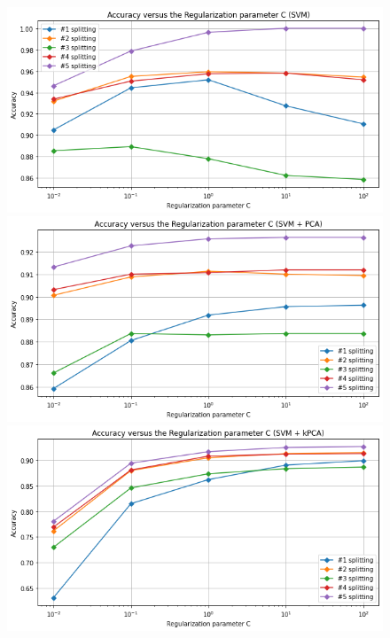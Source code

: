 \documentclass{article}
\begin{document}
\begin{figure}[!htb]
  \includegraphics[width=\linewidth]{figure/svm.png}
\endminipage\hfill
{}
  \includegraphics[width=\linewidth]{figure/svm_pca.png}
\endminipage\hfill
{}
  \includegraphics[width=\linewidth]{figure/svm_kpca.png}
\endminipage\hfill
{}

\end{figure}
\end{document}
